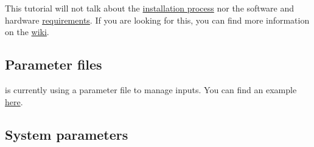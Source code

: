 This tutorial will not talk about the \href{https://github.com/bHimes/emClarity/wiki/Installation}{installation process} nor the software and hardware \href{https://github.com/bHimes/emClarity/wiki/Requirements}{requirements}. If you are looking for this, you can find more information on the \href{https://github.com/bHimes/emClarity/wiki}{wiki}.


\subsection{Parameter files}

{\emClarity} is currently using a parameter file to manage inputs. You can find an example \href{https://github.com/bHimes/emClarity/blob/master/docs/exampleParametersAndRunScript/param0.m}{here}.

\subsection{System parameters}

